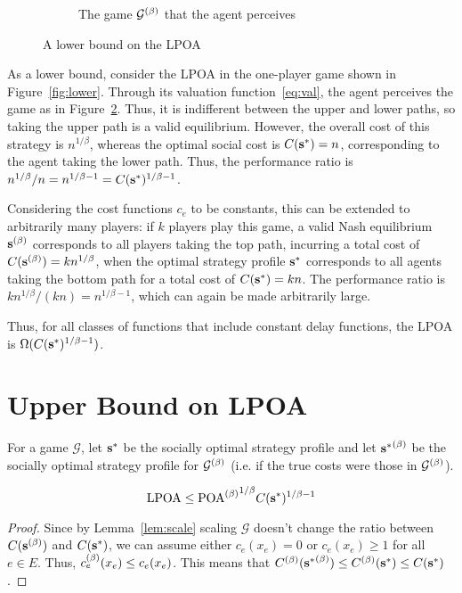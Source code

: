 \documentclass[twoside]{article}
\begin{document}
\begin{multicols}{2}
\begin{figure}[H]
\begin{subfigure}[b]{\linewidth}
    \caption{The game $\mathcal{G}^{(\beta)}$ that the agent perceives}
    \label{fig:lowerbet}
  \end{subfigure}
  \caption{A lower bound on the LPOA}
\end{figure}

As a lower bound, consider the LPOA in the one-player game shown in
Figure~\ref{fig:lower}. Through its valuation function~\eqref{eq:val}, the agent
perceives the game as in Figure~\ref{fig:lowerbet}. Thus, it is indifferent
between the upper and lower paths, so taking the upper path is a valid
equilibrium. However, the overall cost of this strategy is $n^{1/\beta}$,
whereas the optimal social cost is $C(\mathbf{s}^*) = n$, corresponding to the agent
taking the lower path. Thus, the performance ratio is $n^{1/\beta}/n =
n^{1/\beta-1} = C(\mathbf{s}^*)^{1/\beta-1}$.

Considering the cost functions $c_e$ to be constants, this can be extended to
arbitrarily many players: if $k$ players play this game, a valid Nash
equilibrium $\mathbf{s}^{(\beta)}$ corresponds to all players taking the top path, incurring
a total cost of $C(\mathbf{s}^{(\beta)}) = kn^{1/\beta}$, when the optimal strategy profile
$\mathbf{s}^*$ corresponds to all agents taking the bottom path for a total cost of
$C(\mathbf{s}^*) = kn$. The performance ratio is $kn^{1/\beta}/(kn) = n^{1/\beta-1}$,
which can again be made arbitrarily large.

Thus, for all classes of functions that include constant delay functions, the
LPOA is $\Omega(C(\mathbf{s}^*)^{1/\beta-1})$.

\section{Upper Bound on LPOA} \label{sec:ub}
For a game $\mathcal{G}$, let $\mathbf{s}^*$ be the socially optimal strategy profile
and let ${\mathbf{s}^*}^{(\beta)}$ be the socially optimal strategy profile for
$\mathcal{G}^{(\beta)}$ (i.e. if the true costs were those in $\mathcal{G}^{(\beta)}$).
\begin{thm} \label{thm:lpoa}
  \[
    \text{LPOA} \le {\ensuremath{\text{POA}^{(\beta)}}}^{1/\beta} C(\mathbf{s}^*)^{1/\beta-1}
  \]
\end{thm}
\begin{proof}
  Since by Lemma~\ref{lem:scale} scaling $\mathcal{G}$ doesn't change the ratio
  between $C(\mathbf{s}^{(\beta)})$ and $C(\mathbf{s}^*)$, we can assume either $c_e(x_e) = 0$ or
  $c_e(x_e) \ge 1$ for all $e \in E$. Thus, $c_e^{(\beta)}(x_e) \le c_e(x_e)$. This
  means that $C^{(\beta)}({\mathbf{s}^*}^{(\beta)}) \le C^{(\beta)}(\mathbf{s}^*) \le C(\mathbf{s}^*)$.


\end{proof}
\end{multicols}
\end{document}
